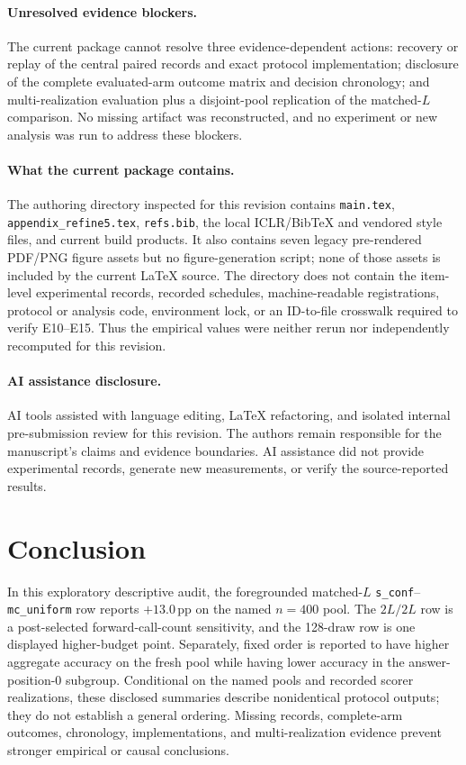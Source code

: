 \documentclass{article}
\newcommand{\sconf}{\texttt{s\_conf}}
\newcommand{\mcu}{\texttt{mc\_uniform}}
\newcommand{\pp}{\,\mathrm{pp}}
\begin{document}
\paragraph{Unresolved evidence blockers.}
The current package cannot resolve three evidence-dependent actions: recovery
or replay of the central paired records and exact protocol implementation;
disclosure of the complete evaluated-arm outcome matrix and decision
chronology; and multi-realization evaluation plus a disjoint-pool replication
of the matched-$L$ comparison.  No missing artifact was reconstructed, and no
experiment or new analysis was run to address these blockers.

\paragraph{What the current package contains.}
The authoring directory inspected for this revision contains
\texttt{main.tex}, \texttt{appendix\_refine5.tex}, \texttt{refs.bib}, the
local ICLR/BibTeX and vendored style files, and current build products.  It
also contains seven legacy pre-rendered PDF/PNG figure assets but no
figure-generation script; none of those assets is included by the current
\LaTeX{} source.  The directory does not contain the item-level experimental
records, recorded schedules, machine-readable registrations, protocol or
analysis code, environment lock, or an ID-to-file crosswalk required to verify
E10--E15.  Thus the empirical values were neither rerun nor independently
recomputed for this revision.

\paragraph{AI assistance disclosure.}
AI tools assisted with language editing, \LaTeX{} refactoring, and isolated
internal pre-submission review for this revision.  The authors remain
responsible for the manuscript's claims and evidence boundaries.  AI
assistance did not provide experimental records, generate new measurements,
or verify the source-reported results.

\section{Conclusion}

In this exploratory descriptive audit, the foregrounded matched-$L$
\sconf{}--\mcu{} row reports $+13.0\pp$ on the named $n=400$ pool.  The
$2L/2L$ row is a post-selected forward-call-count sensitivity, and the
128-draw row is one displayed higher-budget point.  Separately, fixed order is
reported to have higher aggregate accuracy on the fresh pool while having
lower accuracy in the answer-position-0 subgroup.  Conditional on the named
pools and recorded scorer realizations, these disclosed summaries describe
nonidentical protocol outputs; they do not establish a general ordering.
Missing records, complete-arm outcomes, chronology, implementations, and
multi-realization evidence prevent stronger empirical or causal conclusions.




\appendix
\raggedbottom

\end{document}
